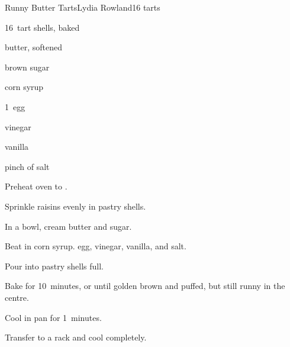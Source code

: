 \begin{recipe}{Runny Butter Tarts}{Lydia Rowland}{16 tarts}

\begin{ingredients}
\item 16~tart shells, baked
\item \C{\quarter} 
\item \C{\quarter} butter, softened
\item \C{\half} brown sugar
\item \C{\half} corn syrup
\item 1~egg
\item {} vinegar
\item {} vanilla
\item pinch of salt
\end{ingredients}

\begin{directions}
\item Preheat oven to .
\item Sprinkle raisins evenly in pastry shells.
\item In a bowl, cream butter and sugar.
\item Beat in corn syrup. egg, vinegar, vanilla, and salt.
\item Pour into pastry shells \threequarter{} full.
\item Bake for 10~minutes, or until golden brown and puffed, but still runny in the centre.
\item Cool in pan for 1~minutes.
\item Transfer to a rack and cool completely.
\end{directions}

\end{recipe}
